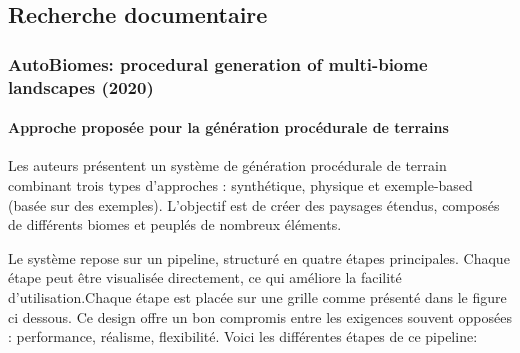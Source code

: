
\subsection{Recherche documentaire}
\subsubsection{AutoBiomes: procedural generation of multi-biome landscapes (2020) \cite{Autobiome}}
    
    
    \paragraph{Approche proposée pour la génération procédurale de terrains}
    Les auteurs présentent un système de génération procédurale de terrain combinant trois types d’approches : synthétique, physique et exemple-based (basée sur des exemples). L’objectif est de créer des paysages étendus, composés de différents biomes et peuplés de nombreux éléments.
    
    Le système repose sur un pipeline, structuré en quatre étapes principales. Chaque étape peut être visualisée directement, ce qui améliore la facilité d’utilisation.Chaque étape est placée sur une grille comme présenté dans le figure ci dessous. Ce design offre un bon compromis entre les exigences souvent opposées : performance, réalisme, flexibilité. Voici les différentes étapes de ce pipeline:

